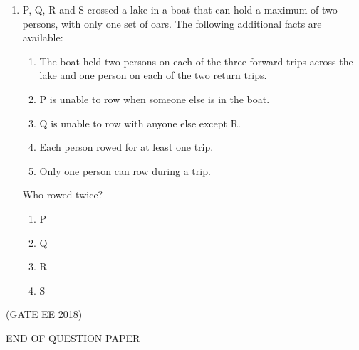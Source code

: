 \documentclass[journal,12pt,onecolumn]{IEEEtran}
\theoremstyle{remark}
\begin{document}
\begin{enumerate}
    \item P, Q, R and S crossed a lake in a boat that can hold a maximum of two persons, with only one set of oars. The following additional facts are available:
    \begin{enumerate}
        \item The boat held two persons on each of the three forward trips across the lake and one person on each of the two return trips.
        \item P is unable to row when someone else is in the boat.
        \item Q is unable to row with anyone else except R.
        \item Each person rowed for at least one trip.
        \item Only one person can row during a trip.
    \end{enumerate}
    Who rowed twice?
    \begin{enumerate}
        \item P
        \item Q
        \item R
        \item S
    \end{enumerate}
\end{enumerate}
\hfill{(GATE EE 2018)}

\vspace{1cm}
\begin{center}
    END OF QUESTION PAPER
\end{center}
\end{document}
